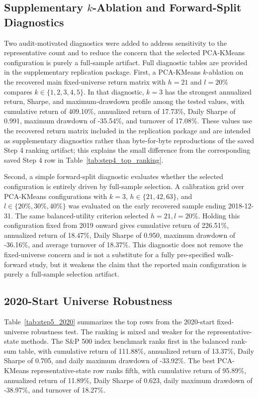 \documentclass[runningheads]{llncs}
\begin{document}
\subsection{Supplementary $k$-Ablation and Forward-Split Diagnostics}

Two audit-motivated diagnostics were added to address sensitivity to the representative count and to reduce the concern that the selected PCA-KMeans configuration is purely a full-sample artifact. Full diagnostic tables are provided in the supplementary replication package. First, a PCA-KMeans $k$-ablation on the recovered main fixed-universe return matrix with $h=21$ and $l=20\%$ compares $k\in\{1,2,3,4,5\}$. In that diagnostic, $k=3$ has the strongest annualized return, Sharpe, and maximum-drawdown profile among the tested values, with cumulative return of 409.10\%, annualized return of 17.73\%, Daily Sharpe of 0.991, maximum drawdown of -35.54\%, and turnover of 17.08\%. These values use the recovered return matrix included in the replication package and are intended as supplementary diagnostics rather than byte-for-byte reproductions of the saved Step 4 ranking artifact; this explains the small difference from the corresponding saved Step 4 row in Table~\ref{tab:step4_top_ranking}.

Second, a simple forward-split diagnostic evaluates whether the selected configuration is entirely driven by full-sample selection. A calibration grid over PCA-KMeans configurations with $k=3$, $h\in\{21,42,63\}$, and $l\in\{20\%,30\%,40\%\}$ was evaluated on the early recovered sample ending 2018-12-31. The same balanced-utility criterion selected $h=21,l=20\%$. Holding this configuration fixed from 2019 onward gives cumulative return of 226.51\%, annualized return of 18.47\%, Daily Sharpe of 0.950, maximum drawdown of -36.16\%, and average turnover of 18.37\%. This diagnostic does not remove the fixed-universe concern and is not a substitute for a fully pre-specified walk-forward study, but it weakens the claim that the reported main configuration is purely a full-sample selection artifact.

\subsection{2020-Start Universe Robustness}

Table~\ref{tab:step5_2020} summarizes the top rows from the 2020-start fixed-universe robustness test. The ranking is mixed and weaker for the representative-state methods. The S\&P 500 index benchmark ranks first in the balanced rank-sum table, with cumulative return of 111.88\%, annualized return of 13.37\%, Daily Sharpe of 0.705, and daily maximum drawdown of -33.92\%. The best PCA-KMeans representative-state row ranks fifth, with cumulative return of 95.89\%, annualized return of 11.89\%, Daily Sharpe of 0.623, daily maximum drawdown of -38.97\%, and turnover of 18.27\%.
\end{document}
